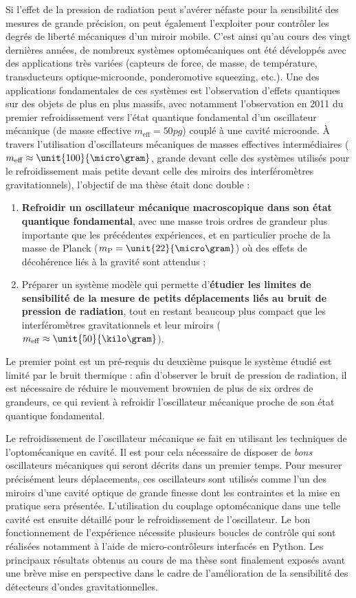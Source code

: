 \documentclass[12pt,a4paper]{article}
\begin{document}
Si l'effet de la pression de radiation peut s'avérer néfaste pour la sensibilité des mesures de grande précision, on peut également l'exploiter pour contrôler les degrés de liberté mécaniques d'un miroir mobile.
C'est ainsi qu'au cours des vingt dernières années, de nombreux systèmes optomécaniques ont été développés avec des applications très variées (capteurs de force, de masse, de température, transducteurs optique-microonde, ponderomotive squeezing, etc.).
Une des applications fondamentales de ces systèmes est l'observation d'effets quantiques sur des objets de plus en plus massifs, avec notamment l'observation en 2011 du premier refroidissement vers l'état quantique fondamental d'un oscillateur mécanique (de masse effective $m_\mathrm{eff} = \unit{50}{pg}$) couplé à une cavité microonde.
À travers l'utilisation d'oscillateurs mécaniques de masses effectives intermédiaires ($m_\mathrm{eff} \approx \unit{100}{\micro\gram}$, grande devant celle des systèmes utilisés pour le refroidissement mais petite devant celle des miroirs des interféromètres gravitationnels), l'objectif de ma thèse était donc double :
\begin{enumerate}
\item \textbf{Refroidir un oscillateur mécanique macroscopique dans son état quantique fondamental}, avec une masse trois ordres de grandeur plus importante que les précédentes expériences, et en particulier proche de la masse de Planck ($m_\mathrm{P}=\unit{22}{\micro\gram}$) où des effets de décohérence liés à la gravité sont attendus ;
\item Préparer un système modèle qui permette d'\textbf{étudier les limites de sensibilité de la mesure de petits déplacements liés au bruit de pression de radiation}, tout en restant beaucoup plus compact que les interféromètres gravitationnels et leur miroirs ($m_\mathrm{eff}\approx\unit{50}{\kilo\gram}$).
\end{enumerate}
Le premier point est un pré-requis du deuxième puisque le système étudié est limité par le bruit thermique : afin d'observer le bruit de pression de radiation, il est nécessaire de réduire le mouvement brownien de plus de six ordres de grandeurs, ce qui revient à refroidir l'oscillateur mécanique proche de son état quantique fondamental.

Le refroidissement de l'oscillateur mécanique se fait en utilisant les techniques de l'optomécanique en cavité.
Il est pour cela nécessaire de disposer de \textit{bons} oscillateurs mécaniques qui seront décrits dans un premier temps.
Pour mesurer précisément leurs déplacements, ces oscillateurs sont utilisés comme l'un des miroirs d'une cavité optique de grande finesse dont les contraintes et la mise en pratique sera présentée.
L'utilisation du couplage optomécanique dans une telle cavité est ensuite détaillé pour le refroidissement de l'oscillateur.
Le bon fonctionnement de l'expérience nécessite plusieurs boucles de contrôle qui sont réalisées notamment à l'aide de micro-contrôleurs interfacés en Python.
Les principaux résultats obtenus au cours de ma thèse sont finalement exposés avant une brève mise en perspective dans le cadre de l'amélioration de la sensibilité des détecteurs d'ondes gravitationnelles.
\end{document}
